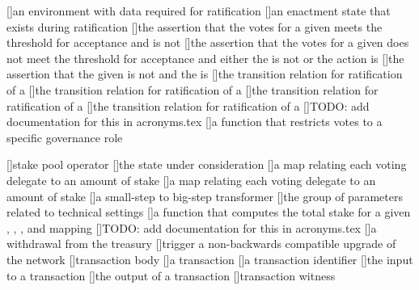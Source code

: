 [\protect{}]{an environment with data required for ratification}
[\protect{}]{an enactment state that exists during ratification}
[\protect{}]{the assertion that the votes for a given \GovAction meets the threshold for acceptance and is not \delayed}
[\protect{}]{the assertion that the votes for a given \GovAction does not meet the threshold for acceptance and either the \currentEpoch is not \expired or the action is \delayed}
[\protect{}]{the assertion that the given \GovAction is not \accepted and
the \currentEpoch is \expired}
[\protect{}]{the transition relation for ratification of a \GovAction}
[\protect{}]{the transition relation for ratification of a \GovAction}
[\protect{}]{the transition relation for ratification of a \GovAction}
[\protect{}]{the transition relation for ratification of a \GovAction}
[\protect{}]{TODO: add documentation for this in acronyms.tex}
[\protect{}]{a function that restricts votes to a specific governance role}

[\protect{}]{stake pool operator} %
[\protect{}]{the state under consideration}
[\protect{}]{a map relating each voting delegate to an amount of stake}
[\protect{}]{a map relating each voting delegate to an amount of stake}
[\protect{}]{a small-step to big-step transformer}
[\protect{}]{the group of parameters related to technical settings}
[\protect{}]{a function that computes the total stake for a given \GovRole, \CC, \StakeDistrs, and \Vote mapping}
[\protect{}]{TODO: add documentation for this in acronyms.tex}
[\protect{}]{a withdrawal from the treasury}
[\protect{}]{trigger a non-backwards compatible upgrade of the network}
[\protect{}]{transaction body}
[\protect{}]{a transaction}
[\protect{}]{a transaction identifier}
[\protect{}]{the input to a \utxo transaction}
[\protect{}]{the output of a \utxo transaction}
[\protect{}]{transaction witness}

